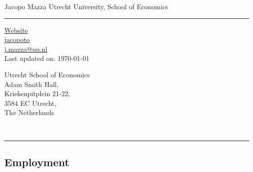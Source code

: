 \documentclass[11pt]{article}
\begin{document}
\begin{center}
\Large \sc Jacopo Mazza \hfill Utrecht University, School of Economics \\
\end{center}
\vspace{-.3cm}
\noindent\rule{\textwidth}{1pt}
\parbox[t]{.45\textwidth}{\begin{flushleft}
    \vspace{-.5cm}
    \begin{footnotesize}
    \href{https://jacopoto.github.io/}{\faGlobe\enspace Website} \\
    \href{github.com/jacopoto} {\faGithub\enspace jacopoto} \\
    \href{mailto:j.mazza@uu.nl}{\faEnvelopeO\enspace j.mazza@uu.nl} \\
    \vspace{.35cm}
    Last updated on: \today \\
    \end{footnotesize}
\end{flushleft}} \hfill
\parbox[t]{.45\textwidth}{\begin{flushright}
    \begin{footnotesize}
    \vspace{-.5cm}
    Utrecht School of Economics \\
    Adam Smith Hall, \\
    Kriekenpitplein 21-22, \\
    3584 EC Utrecht, \\
    The Netherlands \\
    \end{footnotesize}
\end{flushright}} \\
\noindent\rule{\textwidth}{1pt}

\subsection*{\sc Employment}
\end{document}
